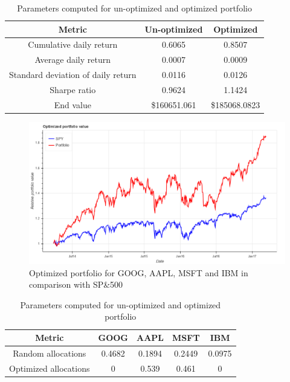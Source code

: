 \documentclass[12pt]{article}
\begin{document}
\begin{itemize}
\begin{table}
\begin{center}
\begin{tabular} {|c|c|c|}
\hline \hline
\textbf{Metric} & \textbf{Un-optimized} & \textbf{Optimized}  \\ \hline
Cumulative daily return & 0.6065 & 0.8507 \\ \hline
Average daily return & 0.0007 & 0.0009\\ \hline
Standard deviation of daily return  & 0.0116 & 0.0126  \\ \hline
Sharpe ratio & 0.9624 & 1.1424 \\ \hline
End value & \$160651.061 & \$185068.0823 \\ \hline
\hline
\end{tabular}
\end{center}
\caption{Parameters computed for un-optimized and optimized portfolio}
\end{table}



\begin{figure}[!htbp]
\label{fig:optimized}
\begin{center}
\includegraphics[height=0.5\textheight,width=\textwidth]{optimized.png}
\caption{Optimized portfolio for GOOG, AAPL, MSFT and IBM in comparison with SP\&500}
\end{center}
\end{figure}

\begin{table}
\begin{center}
\begin{tabular} {|c|c|c|c|c|}
\hline \hline
\textbf{Metric} & \textbf{GOOG} & \textbf{AAPL} & \textbf{MSFT} & \textbf{IBM} \\ \hline
Random allocations & 0.4682 & 0.1894 &0.2449 &0.0975 \\ \hline
Optimized allocations & 0 & 0.539 & 0.461 & 0 \\ \hline
\hline
\end{tabular}
\end{center}
\caption{Parameters computed for un-optimized and optimized portfolio}
\end{table}


\end{itemize}
\end{document}
